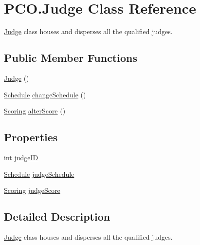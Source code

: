 \hypertarget{classPCO_1_1Judge}{\section{P\+C\+O.\+Judge Class Reference}
\label{classPCO_1_1Judge}
}


\hyperlink{classPCO_1_1Judge}{Judge} class houses and disperses all the qualified judges.  


\subsection*{Public Member Functions}
\begin{DoxyCompactItemize}
\item 
\hyperlink{classPCO_1_1Judge_a6739597d9c654fc3609d0d446288aff9}{Judge} ()
\item 
\hyperlink{classPCO_1_1Schedule}{Schedule} \hyperlink{classPCO_1_1Judge_a3bce6c59a9a68b90fe46114ede94e6ea}{change\+Schedule} ()
\item 
\hyperlink{classPCO_1_1Scoring}{Scoring} \hyperlink{classPCO_1_1Judge_a2361e25d6deedae60ccf12c141f25667}{alter\+Score} ()
\end{DoxyCompactItemize}
\subsection*{Properties}
\begin{DoxyCompactItemize}
\item 
int \hyperlink{classPCO_1_1Judge_ae025be7243620fb90013477bc81bb6ad}{judge\+I\+D}
\item 
\hyperlink{classPCO_1_1Schedule}{Schedule} \hyperlink{classPCO_1_1Judge_abc1631a408c0d72e62daa23783cc6330}{judge\+Schedule}
\item 
\hyperlink{classPCO_1_1Scoring}{Scoring} \hyperlink{classPCO_1_1Judge_a76d950e6f90615fe320c12db369da4c4}{judge\+Score}
\end{DoxyCompactItemize}


\subsection{Detailed Description}
\hyperlink{classPCO_1_1Judge}{Judge} class houses and disperses all the qualified judges. 

